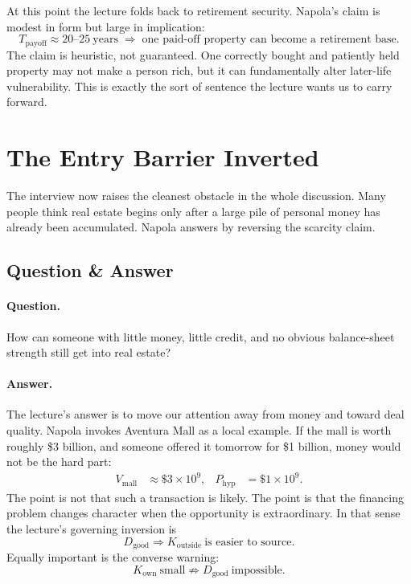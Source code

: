 At this point the lecture folds back to retirement security. Napola's claim is modest in form but large in implication:
\begin{equation}
T_{\text{payoff}} \approx 20\text{--}25\ \text{years}
\;\Rightarrow\;
\text{one paid-off property can become a retirement base.}
\end{equation}
The claim is heuristic, not guaranteed. One correctly bought and patiently held property may not make a person rich, but it can fundamentally alter later-life vulnerability. This is exactly the sort of sentence the lecture wants us to carry forward.

\section{The Entry Barrier Inverted}

The interview now raises the cleanest obstacle in the whole discussion. Many people think real estate begins only after a large pile of personal money has already been accumulated. Napola answers by reversing the scarcity claim.

\subsection{Question \& Answer}

\paragraph{Question.}
How can someone with little money, little credit, and no obvious balance-sheet strength still get into real estate?

\paragraph{Answer.}
The lecture's answer is to move our attention away from money and toward deal quality. Napola invokes Aventura Mall as a local example. If the mall is worth roughly \$3 billion, and someone offered it tomorrow for \$1 billion, money would not be the hard part:
\begin{align}
V_{\text{mall}} &\approx \$3\times 10^9, &
P_{\text{hyp}} &= \$1\times 10^9.
\end{align}
The point is not that such a transaction is likely. The point is that the financing problem changes character when the opportunity is extraordinary. In that sense the lecture's governing inversion is
\begin{equation}
D_{\text{good}} \Rightarrow K_{\text{outside}}\ \text{is easier to source.}
\end{equation}
Equally important is the converse warning:
\begin{equation}
K_{\text{own}}\ \text{small} \not\Rightarrow D_{\text{good}}\ \text{impossible.}
\end{equation}

